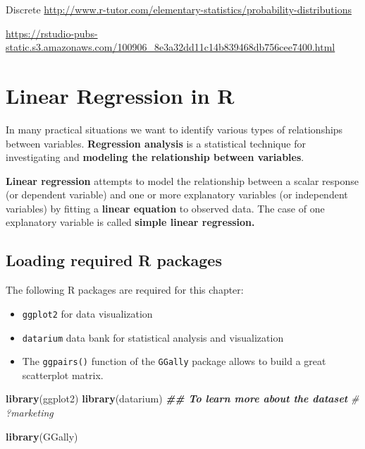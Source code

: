 \documentclass[
]{book}
\newenvironment{Shaded}{\begin{snugshade}}{\end{snugshade}}
\newcommand{\CommentTok}[1]{\textcolor[rgb]{0.56,0.35,0.01}{\textit{#1}}}
\newcommand{\DocumentationTok}[1]{\textcolor[rgb]{0.56,0.35,0.01}{\textbf{\textit{#1}}}}
\newcommand{\FunctionTok}[1]{\textcolor[rgb]{0.13,0.29,0.53}{\textbf{#1}}}
\newcommand{\NormalTok}[1]{#1}
\providecommand{\tightlist}{%
  \setlength{\itemsep}{0pt}\setlength{\parskip}{0pt}}
\begin{document}
Discrete
\url{http://www.r-tutor.com/elementary-statistics/probability-distributions}

\url{https://rstudio-pubs-static.s3.amazonaws.com/100906_8e3a32dd11c14b839468db756cee7400.html}

\hypertarget{linear-regression-in-r}{%
\chapter*{Linear Regression in R}\label{linear-regression-in-r}}


In many practical situations we want to identify various types of relationships between variables. \textbf{Regression analysis} is a statistical technique for investigating and \textbf{modeling the relationship between variables}.

\textbf{Linear regression} attempts to model the relationship between a scalar response (or dependent variable) and one or more explanatory variables (or independent variables) by fitting a \textbf{linear equation} to observed data. The case of one explanatory variable is called \textbf{simple linear regression.}

\hypertarget{loading-required-r-packages}{%
\section{Loading required R packages}\label{loading-required-r-packages}}

The following R packages are required for this chapter:

\begin{itemize}
\tightlist
\item
  \texttt{ggplot2} for data visualization
\item
  \texttt{datarium} data bank for statistical analysis and visualization
\item
  The \texttt{ggpairs()} function of the \texttt{GGally} package allows to build a great scatterplot matrix.
\end{itemize}

\begin{Shaded}
\begin{Highlighting}[]
\FunctionTok{library}\NormalTok{(ggplot2)}
\FunctionTok{library}\NormalTok{(datarium)}
\DocumentationTok{\#\# To learn more about the dataset}
\CommentTok{\# ?marketing}

\FunctionTok{library}\NormalTok{(GGally)}
\end{Highlighting}
\end{Shaded}
\end{document}
